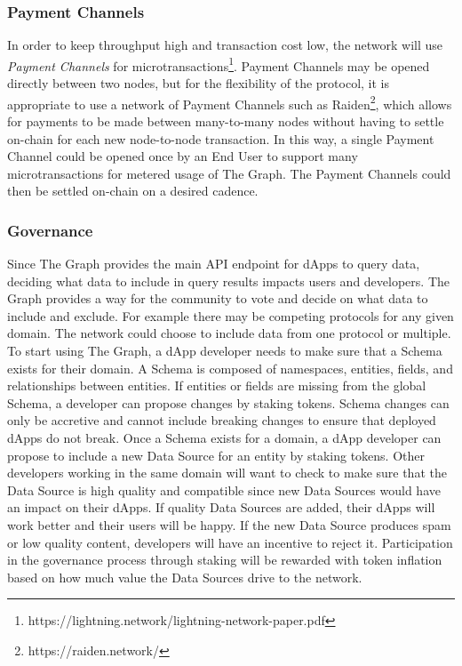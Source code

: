 \documentclass[12pt]{article}
\begin{document}
\subsubsection*{Payment Channels}
In order to keep throughput high and transaction cost low, the network will use \textit{Payment Channels} for microtransactions\footnote{https://lightning.network/lightning-network-paper.pdf}. Payment Channels may be opened directly between two nodes, but for the flexibility of the protocol, it is appropriate to use a network of Payment Channels such as Raiden\footnote{https://raiden.network/}, which allows for payments to be made between many-to-many nodes without having to settle on-chain for each new node-to-node transaction. In this way, a single Payment Channel could be opened once by an End User to support many microtransactions for metered usage of The Graph. The Payment Channels could then be settled on-chain on a desired cadence.
\subsubsection*{Governance}
Since The Graph provides the main API endpoint for dApps to query data, deciding what data to include in query results impacts users and developers. The Graph provides a way for the community to vote and decide on what data to include and exclude. For example there may be competing protocols for any given domain. The network could choose to include data from one protocol or multiple.
\newline
\newline
To start using The Graph, a dApp developer needs to make sure that a Schema exists for their domain. A Schema is composed of namespaces, entities, fields, and relationships between entities. If entities or fields are missing from the global Schema, a developer can propose changes by staking tokens. Schema changes can only be accretive and cannot include breaking changes to ensure that deployed dApps do not break.
\newline
\newline
Once a Schema exists for a domain, a dApp developer can propose to include a new Data Source for an entity by staking tokens. Other developers working in the same domain will want to check to make sure that the Data Source is high quality and compatible since new Data Sources would have an impact on their dApps. If quality Data Sources are added, their dApps will work better and their users will be happy. If the new Data Source produces spam or low quality content, developers will have an incentive to reject it. Participation in the governance process through staking will be rewarded with token inflation based on how much value the Data Sources drive to the network.
\end{document}
